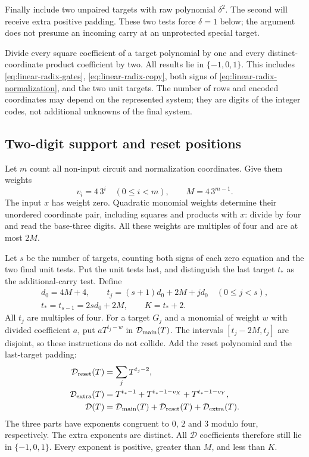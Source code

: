 Finally include two unpaired targets with raw polynomial
$\delta^2$. The second will receive extra positive padding.
These two tests force $\delta=1$ below; the argument does not
presume an incoming carry at an unprotected special target.

Divide every square coefficient of a target polynomial by one
and every distinct-coordinate product coefficient by two. All
results lie in $\{-1,0,1\}$. This includes
\eqref{eq:linear-radix-gates}, \eqref{eq:linear-radix-copy},
both signs of \eqref{eq:linear-radix-normalization}, and the
two unit targets. The number of rows and encoded coordinates
may depend on the represented system; they are digits of the
integer codes, not additional unknowns of the final system.

\subsection{Two-digit support and reset positions}

Let $m$ count all non-input circuit and normalization coordinates.
Give them weights
\[
 v_i=4\,3^i\quad(0\le i<m),\qquad M=4\,3^{m-1}.
\]
The input $x$ has weight zero. Quadratic monomial weights determine
their unordered coordinate pair, including squares and products
with $x$: divide by four and read the base-three digits. All these
weights are multiples of four and are at most $2M$.

Let $s$ be the number of targets, counting both signs of each
zero equation and the two final unit tests. Put the unit tests
last, and distinguish the last target $t_*$ as the additional-carry
test. Define
\begin{equation}\label{eq:linear-radix-support}
 \begin{gathered}
 d_0=4M+4,\qquad
 t_j=(s+1)d_0+2M+jd_0\quad(0\le j<s),\\
 t_*=t_{s-1}=2sd_0+2M,\qquad K=t_*+2.
 \end{gathered}
\end{equation}
All $t_j$ are multiples of four. For a target $G_j$ and a monomial
of weight $w$ with divided coefficient $a$, put $aT^{t_j-w}$ in
$\mathcal D_{\rm main}(T)$. The intervals
$[t_j-2M,t_j]$ are disjoint, so these instructions do not collide.
Add the reset polynomial and the last-target padding:
\begin{equation}\label{eq:linear-radix-padding}
 \begin{aligned}
 \mathcal D_{\rm reset}(T)&=\sum_jT^{t_j-2},\\
 \mathcal D_{\rm extra}(T)&=T^{t_*-1}
                  +T^{t_*-1-v_X}+T^{t_*-1-v_Y},\\
 \mathcal D(T)&=\mathcal D_{\rm main}(T)
                 +\mathcal D_{\rm reset}(T)
                 +\mathcal D_{\rm extra}(T).
 \end{aligned}
\end{equation}
The three parts have exponents congruent to $0$, $2$ and $3$
modulo four, respectively. The extra exponents are distinct.
All $\mathcal D$ coefficients therefore still lie in
$\{-1,0,1\}$. Every exponent is positive, greater than $M$,
and less than $K$.

